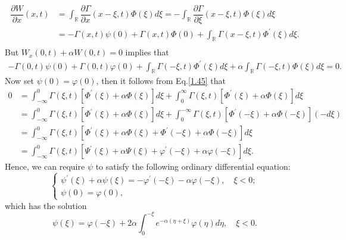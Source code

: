 \documentclass[12pt]{article}
\numberwithin{equation}{section}
\begin{document}
\begin{equation}
    \begin{split}
        \dfrac{\partial W}{\partial x}(x,t)&=\int_{\mathbb{R}} \dfrac{\partial\Gamma}{\partial x}(x-\xi,t)\Phi(\xi)d\xi=-\int_{\mathbb{R}}\dfrac{\partial \Gamma}{\partial \xi}(x-\xi,t)\Phi(\xi)d\xi\\
        &=-\Gamma(x,t)\psi(0)+\Gamma(x,t)\Phi(0)+\int_{\mathbb{R}}\Gamma(x-\xi,t)\Phi^{\prime}(\xi)d\xi.\\
    \end{split}
\end{equation}
But $W_{x}(0,t)+\alpha W(0,t)=0$ implies that 
\begin{equation}\label{1.45}
    \begin{split}
        -\Gamma(0,t)\psi(0)+\Gamma(0,t)\varphi(0)+\int_{\mathbb{R}}\Gamma(-\xi,t)\Phi^{\prime}(\xi)d\xi+\alpha\int_{\mathbb{R}}\Gamma(-\xi,t)\Phi(\xi)d\xi=0.
    \end{split}
\end{equation}
Now set $\psi(0)=\varphi(0)$, then it follows from Eq.\eqref{1.45} that 
\begin{equation}
    \begin{split}
    0&=\int_{-\infty}^{0} \Gamma(\xi,t)[\Phi^{\prime}(\xi)+\alpha\Phi(\xi)]d\xi+\int_{0}^{\infty} \Gamma(\xi,t)[\Phi^{\prime}(\xi)+\alpha\Phi(\xi)]d\xi\\
    &=\int_{-\infty}^{0} \Gamma(\xi,t)[\Phi^{\prime}(\xi)+\alpha\Phi(\xi)]d\xi+\int_{0}^{-\infty} \Gamma(\xi,t)[\Phi^{\prime}(-\xi)+\alpha\Phi(-\xi)](-d\xi)\\
    &=\int_{-\infty}^{0} \Gamma(\xi,t)[\Phi^{\prime}(\xi)+\alpha\Phi(\xi)+\Phi^{\prime}(-\xi)+\alpha\Phi(-\xi)]d\xi\\
    &=\int_{-\infty}^{0} \Gamma(\xi,t)[\Psi^{\prime}(\xi)+\alpha\Psi(\xi)+\varphi^{\prime}(-\xi)+\alpha\varphi(-\xi)]d\xi.
    \end{split}
\end{equation}
Hence, we can require $\psi$ to satisfy the following ordinary differential equation:
\begin{equation}
    \begin{cases}
        \psi^{\prime}(\xi)+\alpha\psi(\xi)=-\varphi^{\prime}(-\xi)-\alpha\varphi(-\xi),\quad \xi<0;\\
        \psi(0)=\varphi(0),
    \end{cases}
\end{equation}
which has the solution
\begin{equation}
    \psi(\xi)=\varphi(-\xi)+2\alpha\int_{0}^{-\xi} e^{-\alpha(\eta+\xi)}\varphi(\eta)d\eta,\quad\xi<0.
\end{equation}
\end{document}
